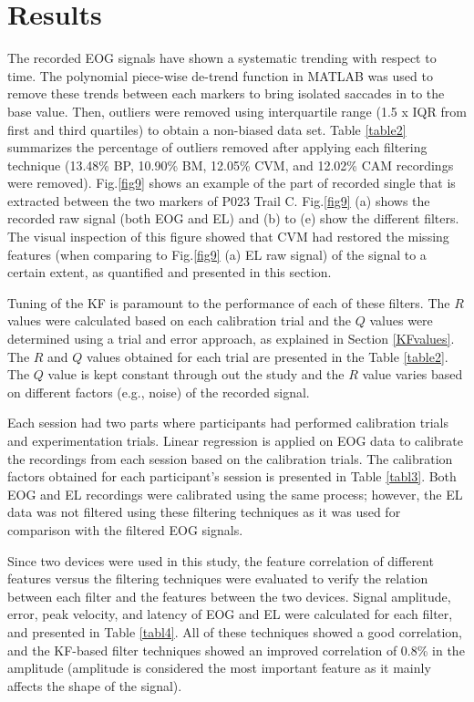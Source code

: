 \documentclass[transmag]{IEEEtran}
\begin{document}
\section{Results}
\label{section5}

The recorded EOG signals have shown a systematic trending with respect to time. The polynomial piece-wise de-trend function in MATLAB was used to remove these trends between each markers to bring isolated saccades in to the base value. Then, outliers were removed using interquartile range (1.5 x IQR from first and third quartiles) to obtain a non-biased data set. Table \ref{table2} summarizes the percentage of outliers removed after applying each filtering technique (13.48\% BP, 10.90\% BM, 12.05\% CVM, and 12.02\% CAM recordings were removed). Fig.\ref{fig9} shows an example of the part of recorded single that is extracted between the two markers of P023 Trail C. Fig.\ref{fig9} (a) shows the recorded raw signal (both EOG and EL) and (b) to (e) show the different filters. The visual inspection of this figure showed that CVM had restored the missing features (when comparing to Fig.\ref{fig9} (a) EL raw signal) of the signal to a certain extent, as quantified and presented in this section.  

Tuning of the KF is paramount to the performance of each of these filters. The $R$ values were calculated based on each calibration trial and the $Q$ values were determined using a trial and error approach, as explained in Section \ref{KFvalues}. The $R$ and $Q$ values obtained for each trial are presented in the Table \ref{table2}. The $Q$ value is kept constant through out the study and the $R$ value varies based on different factors (e.g., noise) of the recorded signal. 

Each session had two parts where participants had performed calibration trials and experimentation trials. Linear regression is applied on EOG data to calibrate the recordings from each session based on the calibration trials. The calibration factors obtained for each participant's session is presented in Table \ref{tabl3}. Both EOG and EL recordings were calibrated using the same process; however, the EL data was not filtered using these filtering techniques as it was used for comparison with the filtered EOG signals. 

Since two devices were used in this study, the feature correlation of different features versus the filtering techniques were evaluated to verify the relation between each filter and the features between the two devices. Signal amplitude, error, peak velocity, and latency of EOG and EL were calculated for each filter, and presented in Table \ref{tabl4}. All of these techniques showed a good correlation, and the KF-based filter techniques showed an improved correlation of 0.8\%  in the amplitude (amplitude is considered the most important feature as it mainly affects the shape of the signal). 
\end{document}

